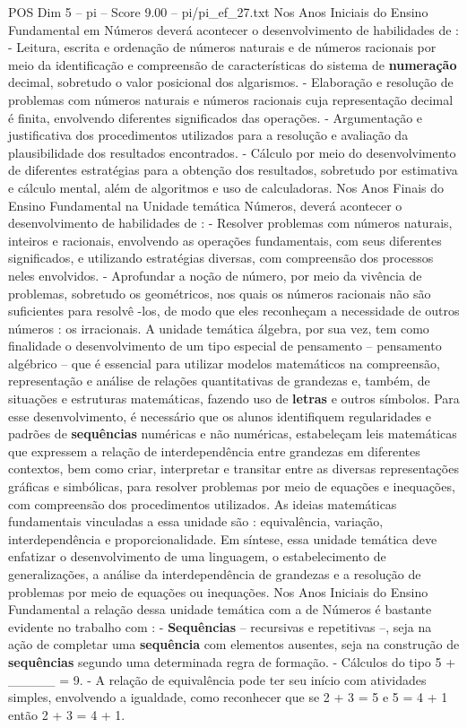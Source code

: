 \begin{textsample}{POS Dim 5 – pi – Score 9.00 – pi/pi\_ef\_27.txt}
Nos Anos Iniciais do Ensino Fundamental em Números deverá acontecer o desenvolvimento de habilidades de : - Leitura, escrita e ordenação de números naturais e de números racionais por meio da identificação e compreensão de características do sistema de \textbf{numeração} decimal, sobretudo o valor posicional dos algarismos. - Elaboração e resolução de problemas com números naturais e números racionais cuja representação decimal é finita, envolvendo diferentes significados das operações. - Argumentação e justificativa dos procedimentos utilizados para a resolução e avaliação da plausibilidade dos resultados encontrados. - Cálculo por meio do desenvolvimento de diferentes estratégias para a obtenção dos resultados, sobretudo por estimativa e cálculo mental, além de algoritmos e uso de calculadoras.
Nos Anos Finais do Ensino Fundamental na Unidade temática Números, deverá acontecer o desenvolvimento de habilidades de : - Resolver problemas com números naturais, inteiros e racionais, envolvendo as operações fundamentais, com seus diferentes significados, e utilizando estratégias diversas, com compreensão dos processos neles envolvidos. - Aprofundar a noção de número, por meio da vivência de problemas, sobretudo os geométricos, nos quais os números racionais não são suficientes para resolvê -los, de modo que eles reconheçam a necessidade de outros números : os irracionais.
A unidade temática álgebra, por sua vez, tem como finalidade o desenvolvimento de um tipo especial de pensamento – pensamento algébrico – que é essencial para utilizar modelos matemáticos na compreensão, representação e análise de relações quantitativas de grandezas e, também, de situações e estruturas matemáticas, fazendo uso de \textbf{letras} e outros símbolos.
Para esse desenvolvimento, é necessário que os alunos identifiquem regularidades e padrões de \textbf{sequências} numéricas e não numéricas, estabeleçam leis matemáticas que expressem a relação de interdependência entre grandezas em diferentes contextos, bem como criar, interpretar e transitar entre as diversas representações gráficas e simbólicas, para resolver problemas por meio de equações e inequações, com compreensão dos procedimentos utilizados.
As ideias matemáticas fundamentais vinculadas a essa unidade são : equivalência, variação, interdependência e proporcionalidade.
Em síntese, essa unidade temática deve enfatizar o desenvolvimento de uma linguagem, o estabelecimento de generalizações, a análise da interdependência de grandezas e a resolução de problemas por meio de equações ou inequações.
Nos Anos Iniciais do Ensino Fundamental a relação dessa unidade temática com a de Números é bastante evidente no trabalho com : - \textbf{Sequências} – recursivas e repetitivas –, seja na ação de completar uma \textbf{sequência} com elementos ausentes, seja na construção de \textbf{sequências} segundo uma determinada regra de formação. - Cálculos do tipo 5 + \_\_\_\_\_ = 9. - A relação de equivalência pode ter seu início com atividades simples, envolvendo a igualdade, como reconhecer que se 2 + 3 = 5 e 5 = 4 + 1 então 2 + 3 = 4 + 1.

\end{textsample}
